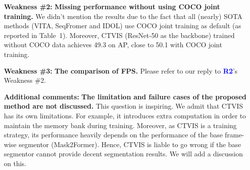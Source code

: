 \documentclass[10pt,twocolumn,letterpaper]{article}
\newcommand{\R}[1]{{\textbf{\ifstrequal{#1}{1}{\textcolor{red}{R#1}}{\ifstrequal{#1}{2}{\textcolor{blue}{R#1}}{\ifstrequal{#1}{3}{\textcolor{green!70!black}{R#1}}{\ifstrequal{#1}{4}{\textcolor{teal}{R#1}}{\textcolor{cyan}{R#1}}}}}}}}
\begin{document}
\noindent\textbf{Weakness \#2:} \textbf{Missing performance without using COCO joint training.} 
We didn't mention the results due to the fact that all (nearly) SOTA methods (\eg VITA, SeqFromer and IDOL) use COCO joint training as default (as reported in Table~1).
Moreover, CTVIS (ResNet-50 as the backbone) trained without COCO data achieves 49.3 on AP, close to 50.1 with COCO joint training.

\noindent\textbf{Weakness \#3:} \textbf{The comparison of FPS.} 
Please refer to our reply to \R2's Weakness \#2.

\noindent\textbf{Additional comments:} \textbf{The limitation and failure cases of the proposed method are not discussed.} 
This question is inspiring. We admit that CTVIS has its own limitations. For example, it introduces extra computation in order to maintain the memory bank during training. Moreover, as CTVIS is a training strategy, its performance 
heavily depends on the performance of the base frame-wise segmentor (\eg Mask2Former). 
Hence, CTVIS is liable to go wrong if the base segmentor cannot provide decent segmentation results. We will add a discussion on this.
\end{document}
